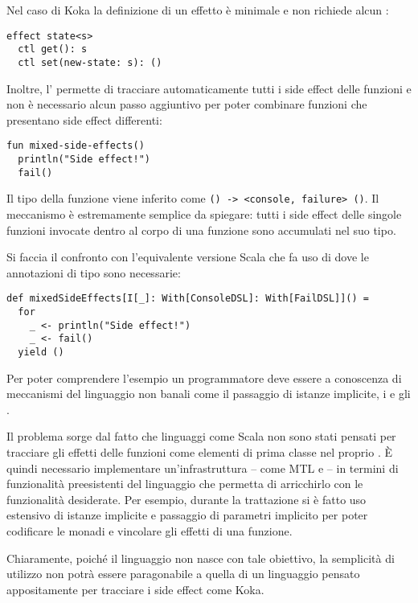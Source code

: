 Nel caso di Koka la definizione di un effetto è minimale e non richiede alcun :
\begin{lstlisting}[language=koka]
effect state<s>
  ctl get(): s
  ctl set(new-state: s): ()
\end{lstlisting}
Inoltre, l' permette di tracciare automaticamente tutti i side effect delle funzioni e non è necessario alcun passo aggiuntivo per poter combinare funzioni che presentano side effect differenti:
\begin{lstlisting}[language=koka]
fun mixed-side-effects()
  println("Side effect!")
  fail()
\end{lstlisting}
Il tipo della funzione viene inferito come \lstinline{() -> <console, failure> ()}. Il meccanismo è estremamente semplice da spiegare: tutti i side effect delle singole funzioni invocate dentro al corpo di una funzione sono accumulati nel suo tipo.

Si faccia il confronto con l'equivalente versione Scala che fa uso di  dove le annotazioni di tipo sono necessarie:
\begin{lstlisting}[language=scala3]
def mixedSideEffects[I[_]: With[ConsoleDSL]: With[FailDSL]]() =
  for
    _ <- println("Side effect!")
    _ <- fail()
  yield ()
\end{lstlisting}
Per poter comprendere l'esempio un programmatore deve essere a conoscenza di meccanismi del linguaggio non banali come il passaggio di istanze implicite, i  e gli .

Il problema sorge dal fatto che linguaggi come Scala non sono stati pensati per tracciare gli effetti delle funzioni come elementi di prima classe nel proprio .
È quindi necessario implementare un'infrastruttura -- come \ac{MTL} e  -- in termini di funzionalità preesistenti del linguaggio che permetta di arricchirlo con le funzionalità desiderate.
Per esempio, durante la trattazione si è fatto uso estensivo di istanze implicite e passaggio di parametri implicito per poter codificare le monadi e vincolare gli effetti di una funzione.

Chiaramente, poiché il linguaggio non nasce con tale obiettivo, la semplicità di utilizzo non potrà essere paragonabile a quella di un linguaggio pensato appositamente per tracciare i side effect come Koka.

